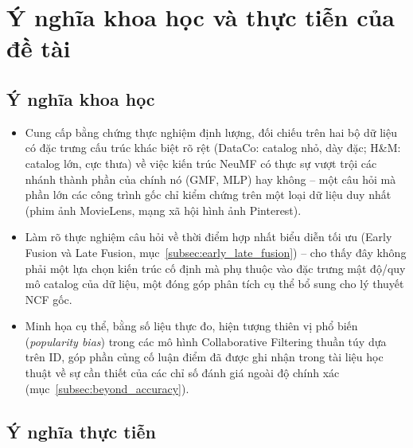 \section{Ý nghĩa khoa học và thực tiễn của đề tài}
\label{sec:ynghia}

\subsection{Ý nghĩa khoa học}
\label{subsec:ynghia_khoahoc}

\begin{itemize}
    \item Cung cấp bằng chứng thực nghiệm định lượng, đối chiếu trên hai bộ dữ liệu có đặc trưng cấu trúc khác biệt rõ rệt (DataCo: catalog nhỏ, dày đặc; H\&M: catalog lớn, cực thưa) về việc kiến trúc NeuMF có thực sự vượt trội các nhánh thành phần của chính nó (GMF, MLP) hay không -- một câu hỏi mà phần lớn các công trình gốc chỉ kiểm chứng trên một loại dữ liệu duy nhất (phim ảnh MovieLens, mạng xã hội hình ảnh Pinterest).
    \item Làm rõ thực nghiệm câu hỏi về thời điểm hợp nhất biểu diễn tối ưu (Early Fusion và Late Fusion, mục~\ref{subsec:early_late_fusion}) -- cho thấy đây không phải một lựa chọn kiến trúc cố định mà phụ thuộc vào đặc trưng mật độ/quy mô catalog của dữ liệu, một đóng góp phân tích cụ thể bổ sung cho lý thuyết NCF gốc.
    \item Minh họa cụ thể, bằng số liệu thực đo, hiện tượng thiên vị phổ biến (\textit{popularity bias}) trong các mô hình Collaborative Filtering thuần túy dựa trên ID, góp phần củng cố luận điểm đã được ghi nhận trong tài liệu học thuật về sự cần thiết của các chỉ số đánh giá ngoài độ chính xác (mục~\ref{subsec:beyond_accuracy}).
\end{itemize}

\subsection{Ý nghĩa thực tiễn}
\label{subsec:ynghia_thucte}

